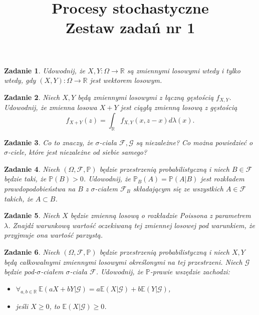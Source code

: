 \documentclass[12pt]{mwart}
\title{Procesy stochastyczne\\ Zestaw zadań nr 1}
\newtheorem{zd}{Zadanie}
\begin{document}
\maketitle
\begin{zd}
	Udowodnij, że $X,Y \colon \Omega\to \mathbb{R}$ są zmiennymi losowymi wtedy i tylko wtedy, gdy $(X,Y)\colon \Omega \to \mathbb{R}$ jest wektorem losowym.
\end{zd}
\begin{zd}
	Niech $X,Y$ będą zmiennymi losowymi z łączną gęstością $f_{X,Y}$. Udowodnij, że zmienna losowa $X+Y$ jest ciągłą zmienną losową z gęstością 
	\begin{displaymath}
	f_{X+Y}(z) = \int_{\mathbb{R}}f_{X,Y}(x,z-x)d\lambda (x).
	\end{displaymath}
\end{zd}
\begin{zd}
	Co to znaczy, że $\sigma$-ciała $\mathcal{F},\mathcal{G}$ są niezależne? Co można powiedzieć o $\sigma$-ciele, które jest niezależne od siebie samego?
\end{zd}	
\begin{zd}
	Niech $(\Omega,\mathcal{F},\mathbb{P})$ będzie przestrzenią probabilistyczną i niech $B\in \mathcal{F}$ będzie taki, że $\mathbb{P}(B) > 0$. Udowodnij, że $\mathbb{P}_B(A) = \mathbb{P}(A|B)$ jest rozkładem prawdopodobieństwa na $B$ z $\sigma$-ciałem $\mathcal{F}_B$ składającym się ze wszystkich $A\in\mathcal{F}$ takich, że $A\subset B$.
\end{zd}
\begin{zd}
	Niech $X$ będzie zmienną losową o rozkładzie Poissona z parametrem $\lambda$. Znajdź warunkową wartość oczekiwaną tej zmiennej losowej pod warunkiem, że przyjmuje ona wartość parzystą.
\end{zd}
\begin{zd}
	Niech $(\Omega, \mathcal{F}, \mathbb{P})$ będzie przestrzenią probabilistyczną i niech $X,Y$ będą całkowalnymi zmiennymi losowymi określonymi na tej przestrzeni. Niech $\mathcal{G}$ będzie pod-$\sigma$-ciałem $\sigma$-ciała $\mathcal{F}$. Udowodnij, że $\mathbb{P}$-prawie wszędzie zachodzi: 
	\begin{itemize}
		\item $\forall_{a,b\in\mathbb{R}}\ \mathbb{E}(aX+bY| \mathcal{G}) = a\mathbb{E}(X|\mathcal{G}) + b\mathbb{E}(Y|\mathcal{G})$,
		\item jeśli $X \geq 0$, to $\mathbb{E}(X|\mathcal{G})\geq 0$.
	\end{itemize}
\end{zd}
\end{document}
